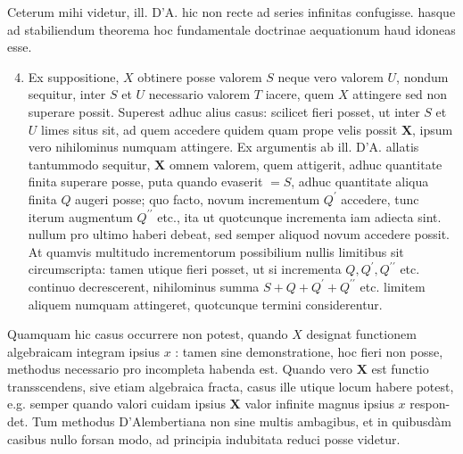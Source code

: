 \documentclass[twoside,12pt, showframe]{memoir}
\begin{document}
Ceterum mihi videtur, ill. D'A. hic non recte ad series infinitas confugisse. hasque ad stabiliendum theorema hoc fundamentale doctrinae aequationum haud idoneas esse.

\begin{enumerate}
  \setcounter{enumi}{3}
  \item Ex suppositione, \(X\) obtinere posse valorem \(S\) neque vero valorem \(U\), nondum sequitur, inter \(S\) et \(U\) necessario valorem \(T\) iacere, quem \(X\) attingere sed non superare possit. Superest adhuc alius casus: scilicet fieri posset, ut inter \(S\) et \(U\) limes situs sit, ad quem accedere quidem quam prope velis possit \(\boldsymbol{X}\), ipsum vero nihilominus numquam attingere. Ex argumentis ab ill. D'A. allatis tantummodo sequitur, \(\boldsymbol{X}\) omnem valorem, quem attigerit, adhuc quantitate finita superare posse, puta quando evaserit \(=S\), adhuc quantitate aliqua finita \(Q\) augeri posse; quo facto, novum incrementum \(Q^{\prime}\) accedere, tunc iterum augmentum \(Q^{\prime \prime}\) etc., ita ut quotcunque incrementa iam adiecta sint. nullum pro ultimo haberi debeat, sed semper aliquod novum accedere possit. At quamvis multitudo incrementorum possibilium nullis limitibus sit circumscripta: tamen utique fieri posset, ut si incrementa \(Q, Q^{\prime}, Q^{\prime \prime}\) etc. continuo decrescerent, nihilominus summa \(S+Q+Q^{\prime}+Q^{\prime \prime}\) etc. limitem aliquem numquam attingeret, quotcunque termini considerentur.
\end{enumerate}

Quamquam hic casus occurrere non potest, quando \(X\) designat functionem algebraicam integram ipsius \(x\) : tamen sine demonstratione, hoc fieri non posse, methodus necessario pro incompleta habenda est. Quando vero \(\boldsymbol{X}\) est functio transscendens, sive etiam algebraica fracta, casus ille utique locum habere potest, e.g. semper quando valori cuidam ipsius \(\boldsymbol{X}\) valor infinite magnus ipsius \(x\) respon-
det. Tum methodus D'Alembertiana non sine multis ambagibus, et in quibusdàm casibus nullo forsan modo, ad principia indubitata reduci posse videtur.
\end{document}
